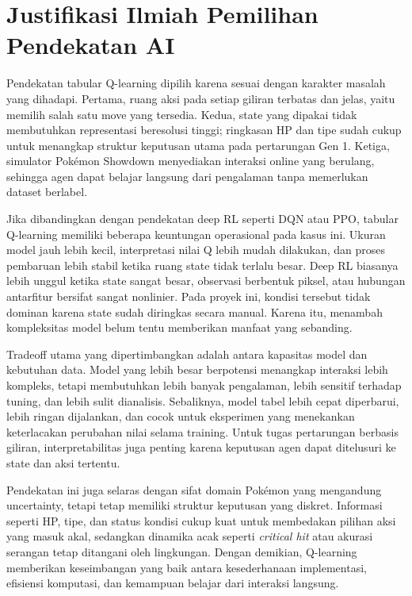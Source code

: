 \documentclass[11pt,a4paper,oneside]{report}
\begin{document}
\section{Justifikasi Ilmiah Pemilihan Pendekatan AI}
Pendekatan tabular Q-learning dipilih karena sesuai dengan karakter masalah yang dihadapi. Pertama, ruang aksi pada setiap giliran terbatas dan jelas, yaitu memilih salah satu move yang tersedia. Kedua, state yang dipakai tidak membutuhkan representasi beresolusi tinggi; ringkasan HP dan tipe sudah cukup untuk menangkap struktur keputusan utama pada pertarungan Gen 1. Ketiga, simulator Pokémon Showdown menyediakan interaksi online yang berulang, sehingga agen dapat belajar langsung dari pengalaman tanpa memerlukan dataset berlabel.

Jika dibandingkan dengan pendekatan deep RL seperti DQN atau PPO, tabular Q-learning memiliki beberapa keuntungan operasional pada kasus ini. Ukuran model jauh lebih kecil, interpretasi nilai Q lebih mudah dilakukan, dan proses pembaruan lebih stabil ketika ruang state tidak terlalu besar. Deep RL biasanya lebih unggul ketika state sangat besar, observasi berbentuk piksel, atau hubungan antarfitur bersifat sangat nonlinier. Pada proyek ini, kondisi tersebut tidak dominan karena state sudah diringkas secara manual. Karena itu, menambah kompleksitas model belum tentu memberikan manfaat yang sebanding.

Tradeoff utama yang dipertimbangkan adalah antara kapasitas model dan kebutuhan data. Model yang lebih besar berpotensi menangkap interaksi lebih kompleks, tetapi membutuhkan lebih banyak pengalaman, lebih sensitif terhadap tuning, dan lebih sulit dianalisis. Sebaliknya, model tabel lebih cepat diperbarui, lebih ringan dijalankan, dan cocok untuk eksperimen yang menekankan keterlacakan perubahan nilai selama training. Untuk tugas pertarungan berbasis giliran, interpretabilitas juga penting karena keputusan agen dapat ditelusuri ke state dan aksi tertentu.

Pendekatan ini juga selaras dengan sifat domain Pokémon yang mengandung uncertainty, tetapi tetap memiliki struktur keputusan yang diskret. Informasi seperti HP, tipe, dan status kondisi cukup kuat untuk membedakan pilihan aksi yang masuk akal, sedangkan dinamika acak seperti \textit{critical hit} atau akurasi serangan tetap ditangani oleh lingkungan. Dengan demikian, Q-learning memberikan keseimbangan yang baik antara kesederhanaan implementasi, efisiensi komputasi, dan kemampuan belajar dari interaksi langsung.
\end{document}
